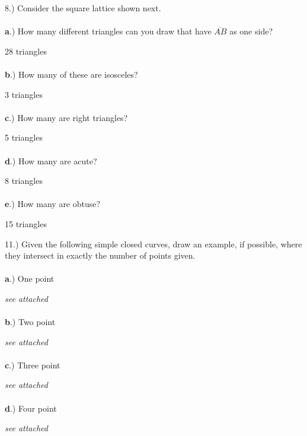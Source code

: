\documentclass[12pt]{article}
\begin{document}
{\setlength{\parindent}{0cm}
8.) Consider the square lattice shown next.
\paragraph{}\textbf{a}.) How many different triangles can you draw that have $\overline{\textit{AB}}$ as one side? \begin{center} 28 triangles \end{center} 
\paragraph{}\textbf{b}.) How many of these are isosceles? \begin{center} 3 triangles \end{center} 
\paragraph{}\textbf{c}.) How many are right triangles? \begin{center} 5 triangles \end{center} 
\paragraph{}\textbf{d}.) How many are acute? \begin{center} 8 triangles \end{center} 
\paragraph{}\textbf{e}.) How many are obtuse? \begin{center} 15 triangles \end{center} 
}
{\setlength{\parindent}{0cm}
11.) Given the following simple closed curves, draw an example, if possible, where they intersect in exactly the number of points given. 
\paragraph{}\textbf{a}.) One point \begin{center} \textit{see attached} \end{center} 
\paragraph{}\textbf{b}.) Two point \begin{center} \textit{see attached} \end{center} 
\paragraph{}\textbf{c}.) Three point \begin{center} \textit{see attached} \end{center} 
\paragraph{}\textbf{d}.)  Four point \begin{center} \textit{see attached} \end{center} 
}
\end{document}
